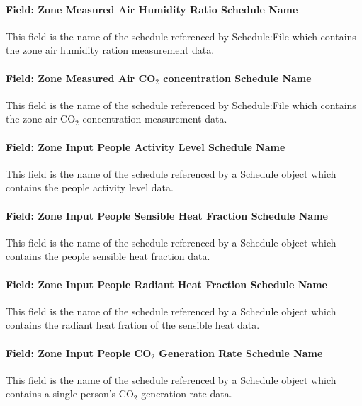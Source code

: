\paragraph{Field: Zone Measured Air Humidity Ratio Schedule Name}\label{field-zone-measured-air-humidity-ratio-schedule-name-hm}
This field is the name of the schedule referenced by Schedule:File which contains the zone air humidity ration measurement data.

\paragraph{Field: Zone Measured Air CO$_2$ concentration Schedule Name}\label{field-zone-measured-air-co2-concentration-schedule-name-hm}
This field is the name of the schedule referenced by Schedule:File which contains the zone air CO$_2$ concentration measurement data.

\paragraph{Field: Zone Input People Activity Level Schedule Name}\label{field-zone-input-people-activity-schedule-name-hm}
This field is the name of the schedule referenced by a Schedule object which contains the people activity level data.

\paragraph{Field: Zone Input People Sensible Heat Fraction Schedule Name}\label{field-zone-input-people-sensible-heat-fraction-schedule-name-hm}
This field is the name of the schedule referenced by a Schedule object which contains the people sensible heat fraction data.

\paragraph{Field: Zone Input People Radiant Heat Fraction Schedule Name}\label{field-zone-input-people-radiant-heat-fraction-schedule-name-hm}
This field is the name of the schedule referenced by a Schedule object which contains the radiant heat fration of the sensible heat data.

\paragraph{Field: Zone Input People CO$_2$ Generation Rate Schedule Name}\label{field-zone-input-people-co2-generation-rate-schedule-name-hm}
This field is the name of the schedule referenced by a Schedule object which contains a single person's CO$_2$ generation rate data.

